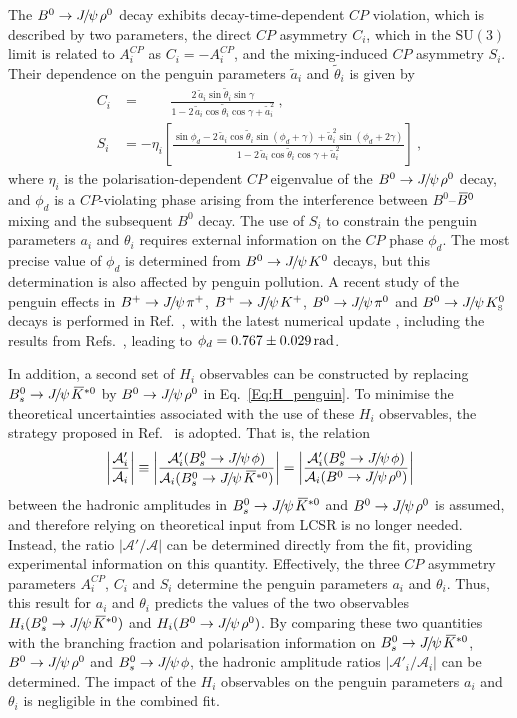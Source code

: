 \documentclass[12pt,a4paper]{article}
\def\grpsuthree {{\ensuremath{\mathrm{SU}(3)}}\xspace}
\newcommand{\CP}{\ensuremath{{C\!P}}\xspace}
\def\PJ      {\ensuremath{J}\xspace}
\newcommand{\rad}{\ensuremath{\rm \,rad}\xspace}
\def\CP                {\ensuremath{C\!P}\xspace}
\def\Ppsi {\ensuremath{\psi}\xspace}
\def\jpsi     {{\ensuremath{{\PJ\mskip -3mu/\mskip -2mu\Ppsi\mskip 2mu}}}\xspace}
\def\Bbar    {\kern 0.18em\overline{\kern -0.18em B}{}\xspace}
\newcommand{\Bd}{\ensuremath{B^0}\xspace}
\def\Bdb     {\ensuremath{\Bbar^0}\xspace}
\newcommand{\Bu}{\ensuremath{B^+}\xspace}
\newcommand{\BsJpsiKst}{\ensuremath{B^0_s\to \jpsi \Kstarzb}\xspace}
\newcommand{\BsJpsiPhi}{\ensuremath{B^0_s\to \jpsi \phi}\xspace}
\def\Kbar  {\kern 0.2em\overline{\kern -0.2em K}{}\xspace}
\def\Kstarzb {\ensuremath{\Kbar^{*0}}\xspace}
\newcommand{\Kp}{\ensuremath{K^+}\xspace}
\newcommand{\KS  }{\ensuremath{K^0_{\mathrm{\scriptscriptstyle S}}}\xspace}
\newcommand{\pip}{\ensuremath{\pi^+}\xspace}
\newcommand{\piz}{\ensuremath{\pi^0}\xspace}
\newcommand{\equref}[1]{Eq.~\ref{#1}}
\begin{document}
The $\Bd\to\jpsi\rho^0$ decay exhibits decay-time-dependent \CP violation, which is described by two parameters, the direct \CP asymmetry $C_i$, which in the \grpsuthree limit is related to $A_i^{\CP}$ as  $C_i = - A_i^{\CP}$, and the mixing-induced \CP asymmetry $S_i$.
Their dependence on the penguin parameters $\tilde{a}_i$ and $\tilde{\theta}_i$ is given by
\begin{align}
C_i & =\phantom{-\eta_f~~}\frac{2\,\tilde{a}_i \sin\tilde{\theta}_i\sin\gamma}{1-2\,\tilde{a}_i\cos\tilde{\theta}_i\cos\gamma+\tilde{a}_i^2}\:,\\
S_i & = -\eta_i\left[\frac{\sin\phi_d-2\,\tilde{a}_i \cos\tilde{\theta}_i\sin(\phi_d+\gamma)+\tilde{a}_i^2\sin(\phi_d+2\gamma)}{1-2\,\tilde{a}_i\cos\tilde{\theta}_i\cos\gamma+\tilde{a}_i^2}\right]\:,
\end{align}
where $\eta_i$ is the polarisation-dependent \CP eigenvalue of the $\Bd\to\jpsi\rho^0$ decay, and $\phi_d$ is a \CP-violating phase arising from the interference between $\Bd$--$\Bdb$ mixing and the subsequent $\Bd$ decay.
The use of $S_i$ to constrain the penguin parameters $a_i$ and $\theta_i$ requires external information on the \CP phase $\phi_d$.
The most precise value of $\phi_d$ is determined from $\Bd\to\jpsi K^0$ decays, but this determination is also affected by penguin pollution.
A recent study of the penguin effects in $\Bu\to\jpsi\pip$, $\Bu\to\jpsi\Kp$, $\Bd\to\jpsi\piz$ and $\Bd\to\jpsi\KS$ decays is performed in Ref.~\cite{DeBruyn:2014oga}, with the latest numerical update \cite{ThesisKDeBruyn}, including the results from Refs.~\cite{LHCb-PAPER-2015-004,LHCb-PAPER-2015-005,Charles:2015gya}, leading to $\phi_d = 0.767 \pm 0.029\rad$.

In addition, a second set of $H_i$ observables can be constructed by replacing \mbox{$\BsJpsiKst$} by $\Bd\to\jpsi\rho^0$ in \equref{Eq:H_penguin}.
To minimise the theoretical uncertainties associated with the use of these $H_i$ observables, the strategy proposed in Ref.~\cite{DeBruyn:2014oga} is adopted.
That is, the relation
\begin{equation}\label{Eq:B2VV_assumption}
\left|\frac{\mathcal{A}'_i}{\mathcal{A}_i}\right| \equiv
\left|\frac{\mathcal{A}'_i(\BsJpsiPhi)}{\mathcal{A}_i(\BsJpsiKst)}\right| = 
\left|\frac{\mathcal{A}'_i(\BsJpsiPhi)}{\mathcal{A}_i(\Bd\to\jpsi\rho^0)}\right|
\end{equation}
between the hadronic amplitudes in $\BsJpsiKst$ and $\Bd\to\jpsi\rho^0$ is assumed, and therefore relying on theoretical input from LCSR is no longer needed.
Instead, the ratio $|\mathcal{A'}/\mathcal{A}|$ can be determined directly from the fit, providing experimental information on this quantity.
Effectively, the three \CP asymmetry parameters $A_i^{\CP}$, $C_i$ and $S_i$ determine the penguin parameters $a_i$ and $\theta_i$.
Thus, this result for $a_i$ and $\theta_i$ predicts the values of the two observables $H_i(\BsJpsiKst)$ and $H_i(\Bd\to\jpsi\rho^0)$.
By comparing these two quantities with the branching fraction and polarisation information on \BsJpsiKst, $\Bd\to\jpsi\rho^0$ and $\BsJpsiPhi$, the hadronic amplitude ratios $|\mathcal{A}'_i/\mathcal{A}_i|$ can be determined.
The impact of the $H_i$ observables on the penguin parameters $a_i$ and $\theta_i$ is negligible in the combined fit.
\end{document}
